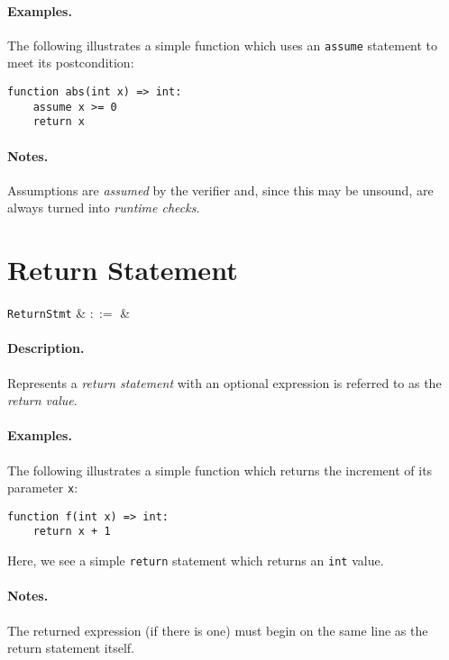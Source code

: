\paragraph{Examples.}  The following illustrates a simple function
which uses an \lstinline{assume} statement to meet its
postcondition:

\begin{lstlisting}
function abs(int x) => int:
    assume x >= 0
    return x
\end{lstlisting}

\paragraph{Notes.} Assumptions are {\em assumed} by the verifier and, since
this may be unsound, are always turned into {\em runtime checks}.


\section{Return Statement}

\begin{syntax}
  \verb+ReturnStmt+ & $::=$ & \ \\
\end{syntax}

\paragraph{Description.}  Represents a {\em return statement} with an
optional expression is referred to as the {\em return value}.

\paragraph{Examples.} The following illustrates a simple function
which returns the increment of its parameter \lstinline{x}:

\begin{lstlisting}
function f(int x) => int:
    return x + 1
\end{lstlisting}

Here, we see a simple \lstinline{return} statement which returns an \lstinline{int} value.

\paragraph{Notes.}  The returned expression (if there is one) must
begin on the same line as the return statement itself.

